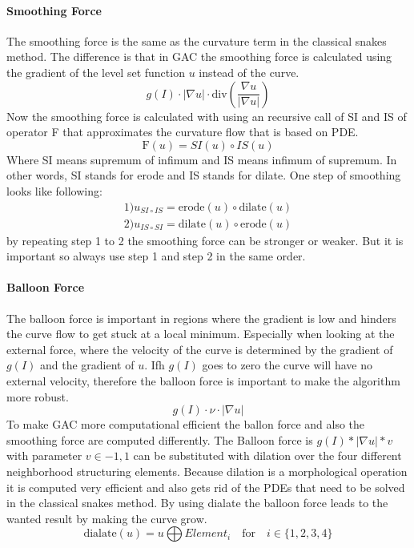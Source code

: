 \paragraph{Smoothing Force}
The smoothing force is the same as the curvature term in the classical snakes method. The difference is that in GAC the smoothing force is calculated using the gradient of the level set function $u$ instead of the curve. 
\begin{equation}
    g(I) \cdot |\nabla u| \cdot \text{div} \left(\frac{\nabla u}{|\nabla u|}\right)
\end{equation}
Now the smoothing force is calculated with using an recursive call of SI and IS of operator F that approximates the curvature flow that is based on PDE. 
\begin{equation}
    \text{F}(u) = SI(u)\circ IS (u)
    \label{eq:smoothingforce}
\end{equation}
Where SI means supremum of infimum and IS means infimum of supremum. In other words, SI stands for erode and IS stands for dilate. One step of smoothing looks like following: 
\begin{align*}
    1) u_{SI\circ IS}=\text{erode}(u) \circ \text{dilate}(u) \\
    2) u_{IS\circ SI}=\text{dilate}(u) \circ \text{erode}(u)
\end{align*}
by repeating step 1 to 2 the smoothing force can be stronger or weaker. But it is important so always use step 1 and step 2 in the same order. 


\paragraph{Balloon Force}
The balloon force is important in regions where the gradient is low and hinders the curve flow to get stuck at a local minimum. Especially when looking at the external force, where the velocity of the curve is determined by the gradient of $g(I)$ and the gradient of $u$. Ifh $g(I)$ goes to zero the curve will have no external velocity, therefore the balloon force is important to make the algorithm more robust.
\begin{equation}
    g(I) \cdot \nu \cdot |\nabla u|
\end{equation}
To make GAC more computational efficient the ballon force and also the smoothing force are computed differently. 
The Balloon force is $g(I)*|\nabla u| *v$ with parameter $v \in  {-1,1}$ can be substituted with dilation over the four different neighborhood structuring elements. Because dilation is a morphological operation it is computed very efficient and also gets rid of the PDEs that need to be solved in the classical snakes method. By using dialate the balloon force leads to the wanted result by making the curve grow. 
\begin{equation}
    \text{dialate}(u)  =  u \bigoplus Element_i \quad \text{for} \quad i \in \{1,2,3,4\}
    \label{dialate}
\end{equation}

